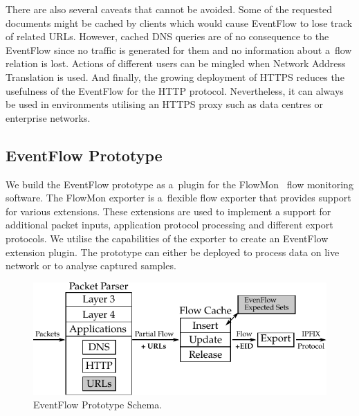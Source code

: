 There are also several caveats that cannot be avoided. Some of the requested documents might be cached by clients which would cause EventFlow to lose track of related URLs. However, cached DNS queries are of no consequence to the EventFlow since no traffic is generated for them and no information about a~flow relation is lost. Actions of different users can be mingled when Network Address Translation is used. And finally, the growing deployment of HTTPS reduces the usefulness of the EventFlow for the HTTP protocol. Nevertheless, it can always be used in environments utilising an HTTPS proxy such as data centres or enterprise networks.



\subsection{EventFlow Prototype} \label{subsec:eventflow-prototype}

We build the EventFlow prototype as a~plugin for the FlowMon~\cite{FlowmonNetworks--Flowmon} flow monitoring software. The FlowMon exporter is a~flexible flow exporter that provides support for various extensions. These extensions are used to implement a support for additional packet inputs, application protocol processing and different export protocols. We utilise the capabilities of the exporter to create an EventFlow extension plugin. The prototype can either be deployed to process data on live network or to analyse captured samples.

\begin{figure}[!tb]
    \centering 
    \includegraphics{figures/paper-eventflow/prototype-schema}
    \caption{EventFlow Prototype Schema.}
    \label{fig:eventflow-prototype-schema}
\end{figure}


